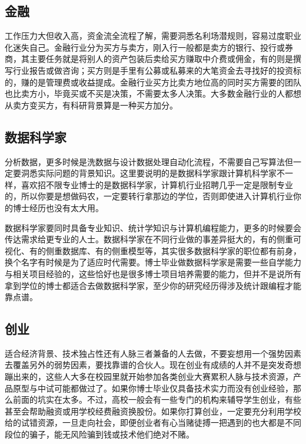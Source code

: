 \documentclass[]{tufte-book}
\begin{document}
\hypertarget{ux91d1ux878d}{%
\subsection{金融}\label{ux91d1ux878d}}

工作压力大但收入高，资金流全流程了解，需要洞悉名利场潜规则，容易过度职业化迷失自己。金融行业分为买方与卖方，刚入行一般都是卖方的银行、投行或券商，其主要任务就是将别人的资产包装后卖给买方赚取中介费或佣金，有的则是撰写行业报告或做咨询；买方则是手里有公募或私募来的大笔资金去寻找好的投资标的，赚的是管理费或收益提成。金融行业买方比卖方地位高的同时买方需要的团队也比卖方小，毕竟买或不买是决策，不需要太多人决策。大多数金融行业的人都想从卖方变买方，有科研背景算是一种买方加分。

\hypertarget{ux6570ux636eux79d1ux5b66ux5bb6}{%
\subsection{数据科学家}\label{ux6570ux636eux79d1ux5b66ux5bb6}}

分析数据，更多时候是洗数据与设计数据处理自动化流程，不需要自己写算法但一定要洞悉实际问题的背景知识。这里要说明的是数据科学家跟计算机科学家不一样，喜欢招不限专业博士的是数据科学家，计算机行业招聘几乎一定是限制专业的，所以你要是想做码农，一定要转行拿那边的学位，否则即使进入计算机行业你的博士经历也没有太大用。

数据科学家要同时具备专业知识、统计学知识与计算机编程能力，更多的时候要会传达需求给更专业的人士。数据科学家在不同行业做的事差异挺大的，有的侧重可视化、有的侧重数据库、有的侧重模型等，其实很多数据科学家的职位都有前身，换个名字有时候是为了适应时代需要。博士毕业做数据科学家是需要一些自学能力与相关项目经验的，这些恰好也是很多博士项目培养需要的能力，但并不是说所有拿到学位的博士都适合去做数据科学家，至少你的研究经历得涉及统计跟编程才能靠点谱。

\hypertarget{ux521bux4e1a}{%
\subsection{创业}\label{ux521bux4e1a}}

适合经济背景、技术独占性还有人脉三者兼备的人去做，不要妄想用一个强势因素去覆盖另外的弱势因素，要找靠谱的合伙人。现在创业有成绩的人并不是突发奇想蹦出来的，这些人大多在校园里就开始参加各类创业大赛累积人脉与技术资源，产品原型与中试可能都做过了。如果你博士毕业仅具备技术实力而没有创业经验，那么前面的坑实在太多。不过，高校一般会有一些专门的机构来辅导学生创业，有些甚至会帮助融资或用学校经费融资换股份。如果你打算创业，一定要充分利用学校给的试错资源，一旦走向社会，即便创业者有心当赌徒搏一把遇到的也大都是不同段位的骗子，能无风险骗到钱或技术他们绝对不赌。
\end{document}
